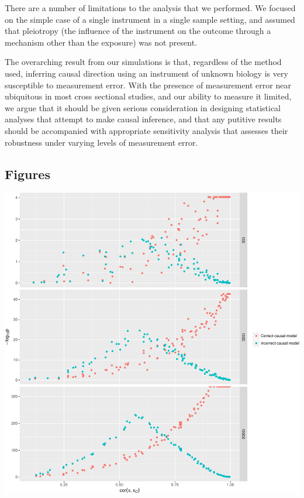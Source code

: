 \documentclass[]{article}
\begin{document}
There are a number of limitations to the analysis that we performed. We
focused on the simple case of a single instrument in a single sample
setting, and assumed that pleiotropy (the influence of the instrument on
the outcome through a mechanism other than the exposure) was not
present.

The overarching result from our simulations is that, regardless of the
method used, inferring causal direction using an instrument of unknown
biology is very susceptible to measurement error. With the presence of
measurement error near ubiquitous in most cross sectional studies, and
our ability to measure it limited, we argue that it should be given
serious consideration in designing statistical analyses that attempt to
make causal inference, and that any putitive results should be
accompanied with appropriate sensitivity analysis that assesses their
robustness under varying levels of measurement error.

\newpage

\subsection{Figures}\label{figures}

\includegraphics{manuscript_files/figure-latex/cit_measurement_error_figure-1.pdf}
\end{document}
